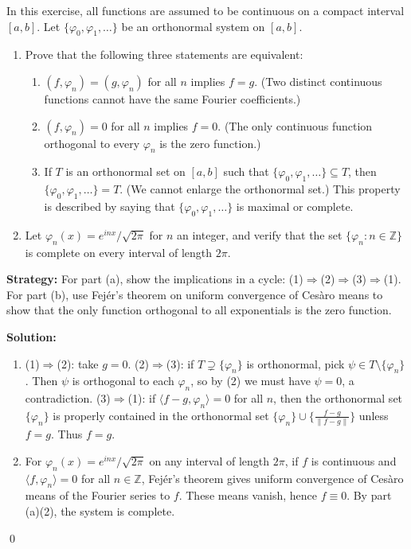 \begin{problembox}
In this exercise, all functions are assumed to be continuous on a compact interval $[a, b]$. Let $\{\varphi_0, \varphi_1, \dots\}$ be an orthonormal system on $[a, b]$.
\begin{enumerate}[label=(\alph*)]
\item Prove that the following three statements are equivalent:
\begin{enumerate}[label=\arabic*)]
\item $(f, \varphi_n) = (g, \varphi_n)$ for all $n$ implies $f = g$. (Two distinct continuous functions cannot have the same Fourier coefficients.)
\item $(f, \varphi_n) = 0$ for all $n$ implies $f = 0$. (The only continuous function orthogonal to every $\varphi_n$ is the zero function.)
\item If $T$ is an orthonormal set on $[a, b]$ such that $\{\varphi_0, \varphi_1, \dots\} \subseteq T$, then $\{\varphi_0, \varphi_1, \dots\} = T$. (We cannot enlarge the orthonormal set.) This property is described by saying that $\{\varphi_0, \varphi_1, \dots\}$ is maximal or complete.
\end{enumerate}
\item Let $\varphi_n(x) = e^{inx}/\sqrt{2\pi}$ for $n$ an integer, and verify that the set $\{\varphi_n : n \in \mathbb{Z}\}$ is complete on every interval of length $2\pi$.
\end{enumerate}
\end{problembox}

\noindent\textbf{Strategy:} For part (a), show the implications in a cycle: (1)$\Rightarrow$(2)$\Rightarrow$(3)$\Rightarrow$(1). For part (b), use Fejér's theorem on uniform convergence of Cesàro means to show that the only function orthogonal to all exponentials is the zero function.

\bigskip\noindent\textbf{Solution:}
\begin{enumerate}[label=(\alph*)]
\item (1)$\Rightarrow$(2): take $g=0$. (2)$\Rightarrow$(3): if $T\supsetneq\{\varphi_n\}$ is orthonormal, pick $\psi\in T\setminus\{\varphi_n\}$. Then $\psi$ is orthogonal to each $\varphi_n$, so by (2) we must have $\psi=0$, a contradiction. (3)$\Rightarrow$(1): if $\langle f- g,\varphi_n\rangle=0$ for all $n$, then the orthonormal set $\{\varphi_n\}$ is properly contained in the orthonormal set $\{\varphi_n\}\cup\{\tfrac{f-g}{\|f-g\|}\}$ unless $f=g$. Thus $f=g$.
\item For $\varphi_n(x)=e^{inx}/\sqrt{2\pi}$ on any interval of length $2\pi$, if $f$ is continuous and $\langle f,\varphi_n\rangle=0$ for all $n\in\mathbb Z$, Fejér's theorem gives uniform convergence of Cesàro means of the Fourier series to $f$. These means vanish, hence $f\equiv 0$. By part (a)(2), the system is complete.
\end{enumerate}\qed


